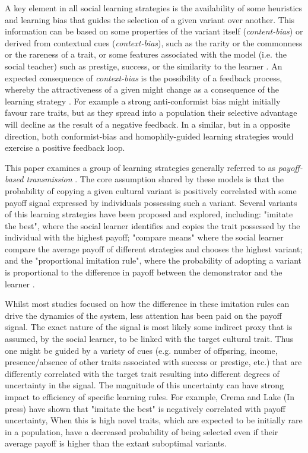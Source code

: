 \documentclass[preprint,authoryear]{elsarticle}
\begin{document}
A key element in all social learning strategies is the availability of some heuristics and learning bias that guides the selection of a given variant over another. This information can be based on some properties of the variant itself (\emph{content-bias}) or derived from contextual cues (\emph{context-bias}), such as the rarity or the commonness or the rareness of a trait, or some features associated with the model (i.e. the social teacher) such as prestige, success, or the similarity to the learner \citep{henrich_mcelreath2003}. An expected consequence of \emph{context-bias} is the possibility of a feedback process, whereby the attractiveness of a given might change as a consequence of the learning strategy \citep{kendal_etal_2009}. For example a strong anti-conformist bias might initially favour rare traits, but as they spread into a population their selective advantage will decline as the result of a negative feedback. In a similar, but in a opposite direction, both conformist-bias and homophily-guided learning strategies would exercise a positive feedback loop.  %

This paper examines a group of learning strategies generally referred to as \emph{payoff-based transmission} \citep{schlag1998,kendal_etal_2009,lake_and_crema_2012,baldini2013,kandler_and_laland_2013,crema_lake_inpress}. The core assumption shared by these models is that the probability of copying a given cultural variant is positively correlated with some payoff signal expressed by individuals possessing such a variant. Several variants of this learning strategies have been proposed and explored, including: "imitate the best", where the social learner identifies and copies the trait possessed by the individual with the highest payoff; "compare means" where the social learner compare the average payoff of different strategies and chooses the highest variant; and the "proportional imitation rule", where the probability of adopting a variant is proportional to the difference in payoff between the demonstrator and the learner \citep{schlag1998,baldini2013}. 

Whilst most studies focused on how the difference in these imitation rules can drive the dynamics of the system, less attention has been paid on the payoff signal.  The exact nature of the signal is most likely some indirect proxy that is assumed, by the social learner, to be linked with the target cultural trait. Thus one might be guided by a variety of cues (e.g. number of offpsring, income, presence/absence of other traits associated with success or prestige, etc.) that are differently correlated with the target trait resulting into different degrees of uncertainty in the signal. The magnitude of this uncertainty can have strong impact to efficiency of specific learning rules. For example, Crema and Lake (In press) have shown that "imitate the best" is negatively correlated with payoff uncertainty, When this is high novel traits, which are expected to be initially rare in a population, have a decreased probability of being selected even if their average payoff is higher than the extant suboptimal variants. 
\end{document}
